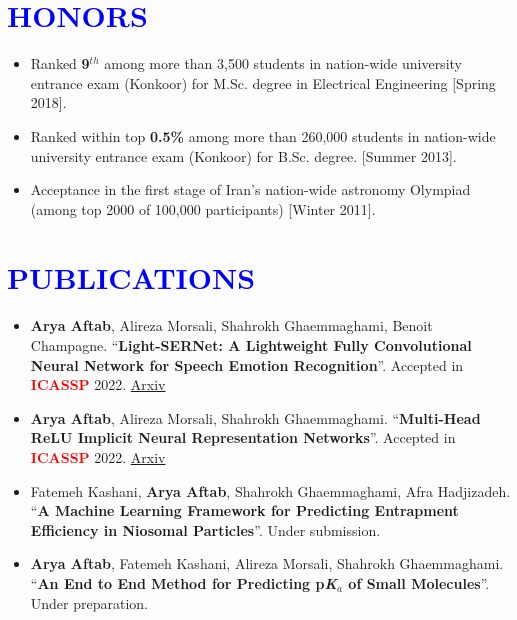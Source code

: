 \documentclass[letterpaper,11pt]{article}
\newcommand{\resumeSubHeadingListStart}{\begin{itemize}[leftmargin=0.0in, label={}]}
\begin{document}
	\section{\Large{\textcolor{blue}{HONORS}}}
	\begin{itemize}[itemsep=-2pt, parsep=5pt]
		\item Ranked \textbf{9$^{th}$} among more than 3,500 students in nation-wide university entrance exam (Konkoor) for M.Sc. degree in Electrical Engineering [Spring 2018].
		\item Ranked within top \textbf{0.5\%} among more than 260,000 students in nation-wide university entrance exam (Konkoor) for B.Sc. degree. [Summer 2013].
		\item Acceptance in the first stage of Iran’s nation-wide astronomy Olympiad (among top 2000 of 100,000 participants) [Winter 2011].
		
	\end{itemize}
	
	
	\section{\Large{\textcolor{blue}{PUBLICATIONS}}}
	\begin{itemize}[itemsep=0pt, parsep=5pt]
		\item \textbf{Arya Aftab}, Alireza Morsali, Shahrokh Ghaemmaghami, Benoit Champagne. “\textbf{Light-SERNet: A Lightweight Fully Convolutional Neural Network for Speech Emotion Recognition}”. Accepted in \textbf{\textcolor{red}{ICASSP}} 2022. \href{https://arxiv.org/pdf/2110.03435.pdf}{Arxiv {\raisebox{-0.1\height}\faExternalLink }}
		\item \textbf{Arya Aftab}, Alireza Morsali, Shahrokh Ghaemmaghami. “\textbf{Multi-Head ReLU Implicit Neural Representation Networks}”. Accepted in \textbf{\textcolor{red}{ICASSP}} 2022. \href{https://arxiv.org/pdf/2110.03448.pdf}{Arxiv {\raisebox{-0.1\height}\faExternalLink }}
		\item Fatemeh Kashani, \textbf{Arya Aftab}, Shahrokh Ghaemmaghami, Afra Hadjizadeh. “\textbf{A Machine Learning Framework for Predicting Entrapment Efficiency in Niosomal Particles}”. Under submission.
		\item \textbf{Arya Aftab}, Fatemeh Kashani, Alireza Morsali, Shahrokh Ghaemmaghami. “\textbf{An End to End Method for Predicting p\textit{K}$_{a}$ of Small Molecules}”. Under preparation.
	\end{itemize}
	\vspace{-10pt}
	
\end{document}
